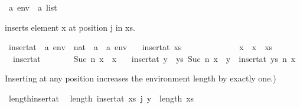 \begin{isabellebody}
\isamarkupfalse%
\ {\isacharparenleft}{\kern0pt}{\isacharprime}{\kern0pt}a{\isacharparenright}{\kern0pt}\ env\ {\isacharequal}{\kern0pt}\ {\isachardoublequoteopen}{\isacharprime}{\kern0pt}a\ list{\isachardoublequoteclose}%
\begin{isamarkuptext}%
 inserts element x at position j in xs.%
\end{isamarkuptext}\isamarkuptrue%
\isamarkupfalse%
\ insert{\isacharunderscore}{\kern0pt}at\ {\isacharcolon}{\kern0pt}{\isacharcolon}{\kern0pt}\ {\isachardoublequoteopen}{\isacharprime}{\kern0pt}a\ env\ {\isasymRightarrow}\ nat\ {\isasymRightarrow}\ {\isacharprime}{\kern0pt}a\ {\isasymRightarrow}\ {\isacharprime}{\kern0pt}a\ env{\isachardoublequoteclose}\ \isanewline
\ \ {\isachardoublequoteopen}insert{\isacharunderscore}{\kern0pt}at\ xs\ \ \ \ \ \ \ {}\ \ \ \ \ \ \ x\ {\isacharequal}{\kern0pt}\ x\ {\isacharhash}{\kern0pt}\ xs{\isachardoublequoteclose}\ {\isacharbar}{\kern0pt}\isanewline
\ \ {\isachardoublequoteopen}insert{\isacharunderscore}{\kern0pt}at\ {\isacharbrackleft}{\kern0pt}{\isacharbrackright}{\kern0pt}\ \ \ \ \ \ \ {\isacharparenleft}{\kern0pt}Suc\ n{\isacharparenright}{\kern0pt}\ x\ {\isacharequal}{\kern0pt}\ {\isacharbrackleft}{\kern0pt}x{\isacharbrackright}{\kern0pt}{\isachardoublequoteclose}\ {\isacharbar}{\kern0pt}\isanewline
\ \ {\isachardoublequoteopen}insert{\isacharunderscore}{\kern0pt}at\ {\isacharparenleft}{\kern0pt}y\ {\isacharhash}{\kern0pt}\ ys{\isacharparenright}{\kern0pt}\ {\isacharparenleft}{\kern0pt}Suc\ n{\isacharparenright}{\kern0pt}\ x\ {\isacharequal}{\kern0pt}\ y\ {\isacharhash}{\kern0pt}\ insert{\isacharunderscore}{\kern0pt}at\ ys\ n\ x{\isachardoublequoteclose}%
\begin{isamarkuptext}%
Inserting at any position increases the environment length by exactly one.)%
\end{isamarkuptext}\isamarkuptrue%
\isamarkupfalse%
\ length{\isacharunderscore}{\kern0pt}insert{\isacharunderscore}{\kern0pt}at{\isacharcolon}{\kern0pt}\isanewline
\ \ {\isachardoublequoteopen}length\ {\isacharparenleft}{\kern0pt}insert{\isacharunderscore}{\kern0pt}at\ xs\ j\ y{\isacharparenright}{\kern0pt}\ {\isacharequal}{\kern0pt}\ length\ xs\ {\isacharplus}{\kern0pt}\ {}{\isachardoublequoteclose}\isanewline
%
\isadelimproof
%
\endisadelimproof
%
\isatagproof
{}\isamarkupfalse%

\end{isabellebody}
